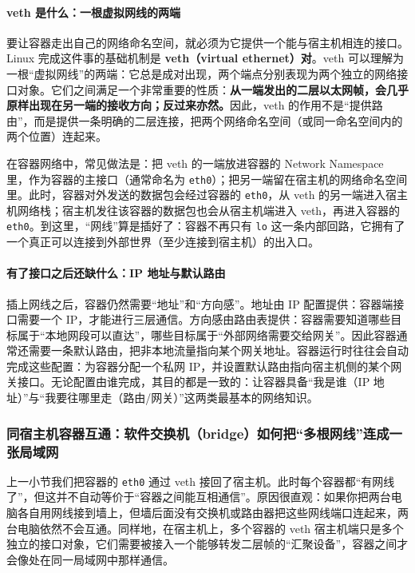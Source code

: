 \paragraph{veth 是什么：一根虚拟网线的两端}

要让容器走出自己的网络命名空间，就必须为它提供一个能与宿主机相连的接口。Linux 完成这件事的基础机制是 \textbf{veth（virtual ethernet）对}。veth 可以理解为一根“虚拟网线”的两端：它总是成对出现，两个端点分别表现为两个独立的网络接口对象。它们之间满足一个非常重要的性质：\textbf{从一端发出的二层以太网帧，会几乎原样出现在另一端的接收方向；反过来亦然。}因此，veth 的作用不是“提供路由”，而是提供一条明确的二层连接，把两个网络命名空间（或同一命名空间内的两个位置）连起来。

在容器网络中，常见做法是：把 veth 的一端放进容器的 Network Namespace 里，作为容器的主接口（通常命名为 \texttt{eth0}）；把另一端留在宿主机的网络命名空间里。此时，容器对外发送的数据包会经过容器的 \texttt{eth0}，从 veth 的另一端进入宿主机网络栈；宿主机发往该容器的数据包也会从宿主机端进入 veth，再进入容器的 \texttt{eth0}。到这里，“网线”算是插好了：容器不再只有 \texttt{lo} 这一条内部回路，它拥有了一个真正可以连接到外部世界（至少连接到宿主机）的出入口。

\paragraph{有了接口之后还缺什么：IP 地址与默认路由}

插上网线之后，容器仍然需要“地址”和“方向感”。地址由 IP 配置提供：容器端接口需要一个 IP，才能进行三层通信。方向感由路由表提供：容器需要知道哪些目标属于“本地网段可以直达”，哪些目标属于“外部网络需要交给网关”。因此容器通常还需要一条默认路由，把非本地流量指向某个网关地址。容器运行时往往会自动完成这些配置：为容器分配一个私网 IP，并设置默认路由指向宿主机侧的某个网关接口。无论配置由谁完成，其目的都是一致的：让容器具备“我是谁（IP 地址）”与“我要往哪里走（路由/网关）”这两类最基本的网络知识。


\subsubsection{同宿主机容器互通：软件交换机（bridge）如何把“多根网线”连成一张局域网}

上一小节我们把容器的 \texttt{eth0} 通过 veth 接回了宿主机。此时每个容器都“有网线了”，但这并不自动等价于“容器之间能互相通信”。原因很直观：如果你把两台电脑各自用网线接到墙上，但墙后面没有交换机或路由器把这些网线端口连起来，两台电脑依然不会互通。同样地，在宿主机上，多个容器的 veth 宿主机端只是多个独立的接口对象，它们需要被接入一个能够转发二层帧的“汇聚设备”，容器之间才会像处在同一局域网中那样通信。

